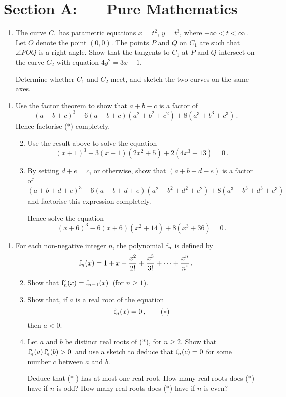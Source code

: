 \documentclass[a4, 11pt]{report}
\newlength{\qspace}
\newcounter{qnumber}
\newenvironment{question}%
 {\vspace{\qspace}
  \begin{enumerate}[\bfseries 1\quad][10]%
    \setcounter{enumi}{\value{qnumber}}%
    \item%
 }
{
  \end{enumerate}
  \filbreak
  \stepcounter{qnumber}
 }
\newenvironment{questionparts}[1][1]%
 {
  \begin{enumerate}[\bfseries (i)]%
    \setcounter{enumii}{#1}
    \addtocounter{enumii}{-1}
    \setlength{\itemsep}{5mm}
    \setlength{\parskip}{8pt}
 }
 {
  \end{enumerate}
 }
\def\f{{\rm f}}
\def\ge{\geqslant}
\begin{document}
\setcounter{page}{2}

 
\section*{Section A: \ \ \ Pure Mathematics}


\begin{question}
The curve $C_1$ has parametric equations $x=t^2$, $y= t^3$, where 
$-\infty < t < \infty\,$. 
Let $O$ denote the point $(0,0)$.
The points $P$ and $Q$ on $C_1$  are such that $\angle POQ$ is
a right angle. Show that the tangents to $C_1$  at $P$ and $Q$ 
intersect on the curve $C_2$  with equation $4y^2=3x-1$.

Determine whether  $C_1$ and $C_2$ meet, and sketch the two
curves on the same axes.

\end{question}


\begin{question}
Use the factor theorem to show that $a+b-c$ is a factor of 
\[
(a+b+c)^3 -6(a+b+c)(a^2+b^2+c^2) +8(a^3+b^3+c^3)
\,.
\tag{$*$}
\]
Hence factorise ($*$) completely.

\begin{questionparts}
\item 
Use the result above to solve the equation
\[
(x+1)^3 -3  (x+1)(2x^2 +5) +2(4x^3+13)=0\,.
\]


\item
By setting  $d+e=c$, or otherwise, show that 
$(a+b-d-e)$ is a factor of 
\[
(a+b+d+e)^3 -6(a+b+d+e)(a^2+b^2+d^2+e^2) +8(a^3+b^3+d^3+e^3)
\,
\]
and factorise this expression completely.
  
Hence solve the equation
\[
(x+6)^3 - 6(x+6)(x^2+14) +8(x^3+36)=0\,.
\]
\end{questionparts}

\end{question}

\begin{question}
For each non-negative integer $n$, the polynomial $\f_n$ is defined by
\[
\f_n(x) = 1 + x + \frac{x^2}{2!} + \frac {x^3}{3!} + \cdots + \frac{x^n}{n!}
\,.
\]
\begin{questionparts}
\item
Show that  $\f'_{n}(x) = \f_{n-1}(x)\,$ (for $n\ge1$).
\item 
Show that, if $a$  is a real root 
of  the equation \[\f_n(x)=0\,,\tag{$*$}\] then $a<0$.
\item
Let $a$ and $b$ be  distinct real 
roots of ($*$), for $n\ge2$. Show that  $\f_n'(a)\, \f_n'(b)>0\,$
and use a sketch to deduce
that  $\f_n(c)=0$ for some number $c$ between $a$ and $b$.

Deduce that ($*$ )  has at most one real root.
How many real roots does ($*$)  have 
if $n$ is odd?
How many real roots does ($*$) have 
if $n$ is even?

\end{questionparts}

\end{question}
\end{document}
